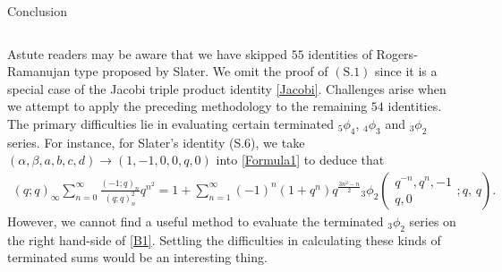 \documentclass[reqno,12pt]{amsart}
\theoremstyle{remark}
\numberwithin{equation}{section}
\begin{document}
\begin{section}{Conclusion}
\begin{table}[thbp]
\begin{tabularx}{\textwidth}{lX}
\end{tabularx}
\end{table}
Astute readers may be 
aware that we have skipped  $55$ identities of Rogers-Ramanujan type proposed by Slater.  We omit the proof of $\left(\mathrm{S}.1\right)$ since it is a special case of  the Jacobi triple product identity \eqref{Jacobi}.  Challenges arise when we attempt to apply the preceding methodology to the remaining $54$ identities. The primary difficulties lie in evaluating certain terminated  $_5\phi_4$, $_4\phi_3$ and $_3\phi_2$ series. For instance, for Slater's identity (S.6), we take $\left(\alpha,\beta,a,b,c,d\right)\to\left(1,-1,0,0,q,0\right)$ into \eqref{Formula1} to deduce that
\begin{align}
\left(q;q\right)_{\infty}\sum_{n=0}^{\infty}
\frac{\left(-1;q\right)_n}{\left(q;q\right)^2_n}q^{n^2}
=1+\sum_{n=1}^{\infty}\left(-1\right)^n\left(1+q^n\right)q^{\frac{3n^2-n}{2}}
{_3\phi_2}\left(\begin{array}{ccc}
q^{-n},q^n,-1\\
q,0
\end{array};q,\,q\right).\label{B1}
\end{align}
However, we cannot find a useful method to evaluate the terminated
 $_3\phi_2$ series on the right hand-side of \eqref{B1}.  Settling the difficulties in calculating these kinds of terminated sums would be an interesting thing.
\end{section}
\end{document}
